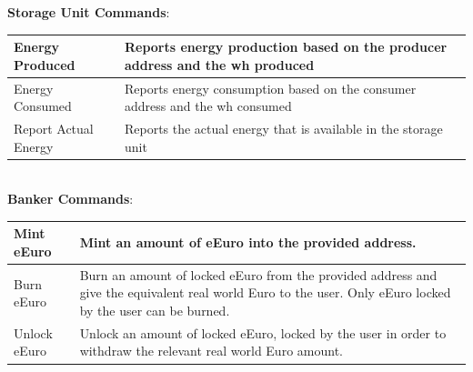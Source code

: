 \textbf{Storage Unit Commands}:\\
\begin{tabular}{|p{5.5cm}|p{8cm}|}
    \hline
    Energy Produced & Reports energy production based on the producer address and the wh produced \\ \hline
    Energy Consumed & Reports energy consumption based on the consumer address and the wh consumed \\ \hline
    Report Actual Energy & Reports the actual energy that is available in the storage unit  \\ \hline
\end{tabular}\\

\textbf{Banker Commands}:\\
\begin{tabular}{|p{5.5cm}|p{8cm}|}
    \hline
    Mint eEuro & Mint an amount of eEuro into the provided address. \\ \hline
    Burn eEuro & Burn an amount of locked eEuro from the provided address and give the equivalent real world Euro to the user. Only eEuro locked by the user can be burned. \\ \hline
    Unlock eEuro & Unlock an amount of locked eEuro, locked by the user in order to withdraw the relevant real world Euro amount. \\ \hline
\end{tabular}\\

